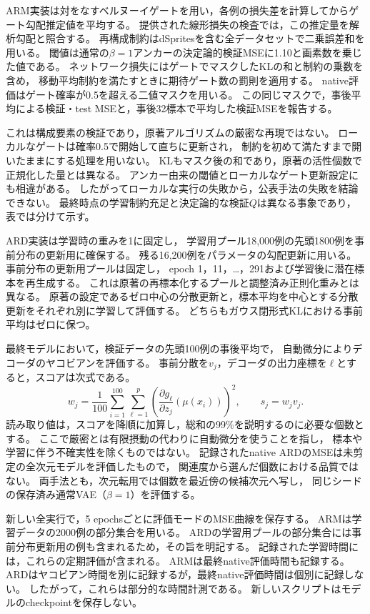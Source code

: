 \documentclass[11pt,a4paper]{ltjsarticle}
\begin{document}
ARM実装は対をなすベルヌーイゲートを用い，各例の損失差を計算してからゲート勾配推定値を平均する。
提供された線形損失の検査では，この推定量を解析勾配と照合する。
再構成制約はdSpritesを含む全データセットで二乗誤差和を用いる。
閾値は通常の$\beta=1$アンカーの決定論的検証MSEに1.10と画素数を乗じた値である。
ネットワーク損失にはゲートでマスクしたKLの和と制約の乗数を含め，
移動平均制約を満たすときに期待ゲート数の罰則を適用する。
native評価はゲート確率が0.5を超える二値マスクを用いる。
この同じマスクで，事後平均による検証・test MSEと，事後32標本で平均した検証MSEを報告する。

これは構成要素の検証であり，原著アルゴリズムの厳密な再現ではない\cite{deboom2020geco}。
ローカルなゲートは確率0.5で開始して直ちに更新され，
制約を初めて満たすまで開いたままにする処理を用いない。
KLもマスク後の和であり，原著の活性個数で正規化した量とは異なる。
アンカー由来の閾値とローカルなゲート更新設定にも相違がある。
したがってローカルな実行の失敗から，公表手法の失敗を結論できない。
最終時点の学習制約充足と決定論的な検証$Q$は異なる事象であり，表では分けて示す。

ARD実装は学習時の重みを1に固定し，
学習用プール18,000例の先頭1800例を事前分布の更新用に確保する。
残る16,200例をパラメータの勾配更新に用いる。
事前分布の更新用プールは固定し，
epoch 1，11，\ldots，291および学習後に潜在標本を再生成する。
これは原著の再標本化するプールと調整済み正則化重みとは異なる\cite{saha2025ardvae}。
原著の設定であるゼロ中心の分散更新と，標本平均を中心とする分散更新をそれぞれ別に学習して評価する。
どちらもガウス閉形式KLにおける事前平均はゼロに保つ。

最終モデルにおいて，検証データの先頭100例の事後平均で，
自動微分によりデコーダのヤコビアンを評価する。
事前分散を$v_j$，デコーダの出力座標を$\ell$とすると，スコアは次式である。
\begin{equation}
 w_j=\frac{1}{100}\sum_{i=1}^{100}\sum_{\ell=1}^{p}
 \left(\frac{\partial g_\ell}{\partial z_j}(\mu(x_i))\right)^2,
 \qquad s_j=w_jv_j.
 \label{eq:exactard}
\end{equation}
読み取り値は，スコアを降順に加算し，総和の99\%を説明するのに必要な個数とする。
ここで厳密とは有限摂動の代わりに自動微分を使うことを指し，
標本や学習に伴う不確実性を除くものではない。
記録されたnative ARDのMSEは未剪定の全次元モデルを評価したもので，
関連度から選んだ個数における品質ではない。
両手法とも，次元転用では個数を最近傍の候補次元へ写し，
同じシードの保存済み通常VAE（$\beta=1$）を評価する。

新しい全実行で，5 epochsごとに評価モードのMSE曲線を保存する。
ARMは学習データの2000例の部分集合を用いる。
ARDの学習用プールの部分集合には事前分布更新用の例も含まれるため，その旨を明記する。
記録された学習時間には，これらの定期評価が含まれる。
ARMは最終native評価時間も記録する。
ARDはヤコビアン時間を別に記録するが，最終native評価時間は個別に記録しない。
したがって，これらは部分的な時間計測である。
新しいスクリプトはモデルのcheckpointを保存しない。
\end{document}

